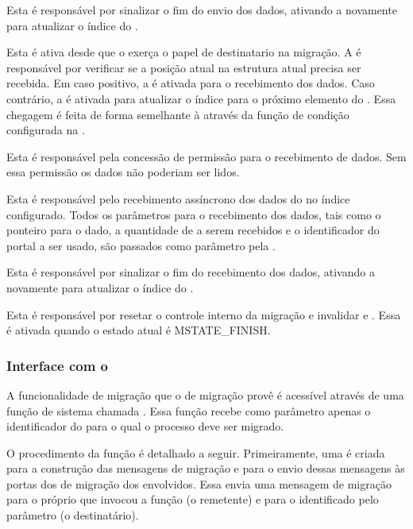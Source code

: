 \begin{description}[leftmargin=*,labelwidth=!,labelindent=0pt]
    \item[8.] Esta \task é responsável por sinalizar o fim do envio dos dados, ativando a  novamente para atualizar o índice do \buffer.
    \item[9.] Esta \task é ativa desde que o \cluster exerça o papel de destinatario na migração. A \task é responsável por verificar se a posição atual na estrutura atual precisa ser recebida. Em caso positivo, a  é ativada para o recebimento dos dados. Caso contrário, a  é ativada para atualizar o índice para o próximo elemento do \buffer. Essa chegagem é feita de forma semelhante à  \ie através da função de condição configurada na .
    \item[10.] Esta \task é responsável pela concessão de permissão para o recebimento de dados. Sem essa permissão os dados não poderiam ser lidos.
    \item[11.] Esta \task é responsável pelo recebimento assíncrono dos dados do \buffer no índice configurado. Todos os parâmetros para o recebimento dos dados, tais como o ponteiro para o dado, a quantidade de \bytes a serem recebidos e o identificador do portal a ser usado, são passados como parâmetro pela .
    \item[12.] Esta \task é responsável por sinalizar o fim do recebimento dos dados, ativando a  novamente para atualizar o índice do \buffer.
    \item[13.] Esta \task é responsável por resetar o controle interno da migração e invalidar \tlbs e \caches. Essa \task é ativada quando o estado atual é MSTATE\_FINISH. 

\end{description}

\subsubsection{Interface com o \Daemon}

A funcionalidade de migração que o \daemon de migração provê é acessível através de uma função de sistema chamada \kmigrateto. Essa função recebe como parâmetro apenas o identificador do \cluster para o qual o processo deve ser migrado.

O procedimento da função \kmigrateto é detalhado a seguir. Primeiramente, uma \task é criada para a construção das mensagens de migração e para o envio dessas mensagens às portas \mailbox dos \daemons de migração dos \clusters envolvidos. Essa \task envia uma mensagem de migração para o próprio \cluster que invocou a função \kmigrateto (o remetente) e para o \cluster identificado pelo parâmetro (o destinatário).

